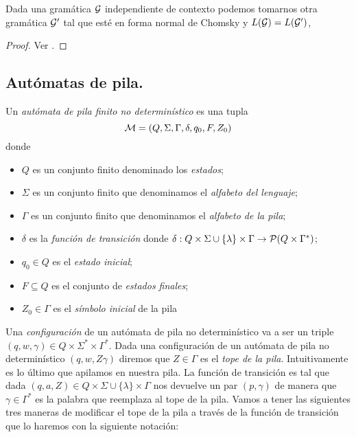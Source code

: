 \documentclass[tesis.tex]{subfiles}
\begin{document}
\begin{prop}
	Dada una gramática $\cal G$ independiente de contexto podemos tomarnos otra gramática $\cal G'$ tal que esté en forma normal de Chomsky y $L({\cal G}) = L(\cal G')$,
\end{prop}

\begin{proof}
	Ver \cite{hopcraft-ullman}.
\end{proof}

\subsection{Autómatas de pila.}

\begin{deff}\label{deff_apnd}
	Un \emph{autómata de pila finito no determinístico} es una tupla 
	\[
	{\cal M } = (Q, \Sigma, \Gamma, \delta, q_0, F, Z_0)
	\]
	donde 
	\begin{itemize}
		\item $Q$ es un conjunto finito denominado los \emph{estados};
		\item $\Sigma$ es un conjunto finito que denominamos el \emph{alfabeto del lenguaje};
		\item $\Gamma$ es un conjunto finito que denominamos el \emph{alfabeto de la pila};
		\item $\delta$ es la \emph{función de transición} donde $\delta: Q  \times \Sigma \cup \{ \lambda \} \times \Gamma \to {\cal P}( Q  \times \Gamma^*)$;
		\item $q_0 \in Q$ es el \emph{estado inicial};
		\item $F \subseteq Q$ es el conjunto de \emph{estados finales};
		\item $Z_{0} \in \Gamma$ es el \emph{símbolo inicial} de la pila
	\end{itemize}
\end{deff}

Una \emph{configuración} de un autómata de pila no determinístico va a ser un triple $(q,w,\gamma) \in Q \times \Sigma^* \times \Gamma^*$.
Dada una configuración de un autómata de pila no determinístico $(q,w, Z\gamma)$ diremos que $Z \in \Gamma$ es el \emph{tope de la pila}.
Intuitivamente es lo último que apilamos en nuestra pila.
La función de transición es tal que dada $(q,a,Z) \in Q  \times \Sigma \cup \{ \lambda \} \times \Gamma $ nos devuelve un par $(p,\gamma)$ de manera que $\gamma \in \Gamma^{*}$ es la palabra que reemplaza al tope de la pila.
Vamos a tener las siguientes tres maneras de modificar el tope de la pila a través de la función de transición que lo haremos con la siguiente notación:
\end{document}
